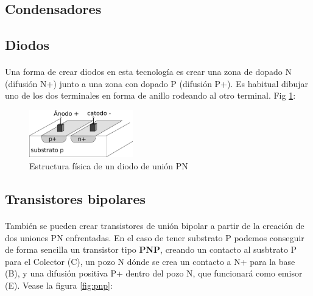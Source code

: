 \paragraph{}

\subsection{Condensadores}
\paragraph{}

\subsection{Diodos}\label{cap:diodos}
\paragraph{}
Una forma de crear diodos en esta tecnología es crear una zona de dopado N (difusión N+)
junto a una zona con dopado P (difusión P+). Es habitual dibujar uno de los dos terminales
en forma de anillo rodeando al otro terminal. Fig \ref{fig:diodo}:

\begin{figure}[h]
	\centering
	\includegraphics[width=0.4\textwidth]{img/diodo.png}
	\caption{Estructura física de un diodo de unión PN}
	\label{fig:diodo}
\end{figure}

\subsection{Transistores bipolares}\label{cap:bipolares}
\paragraph{}
También se pueden crear transistores de unión bipolar a partir de la creación
de dos uniones PN enfrentadas. En el caso de tener substrato P podemos conseguir
de forma sencilla un transistor tipo \textbf{PNP}, creando un contacto al susbtrato
P para el Colector (C), un pozo N dónde se crea un contacto a N+ para la base (B), y
una difusión positiva P+ dentro del pozo N, que funcionará como emisor (E).
Vease la figura \ref{fig:pnp}:

